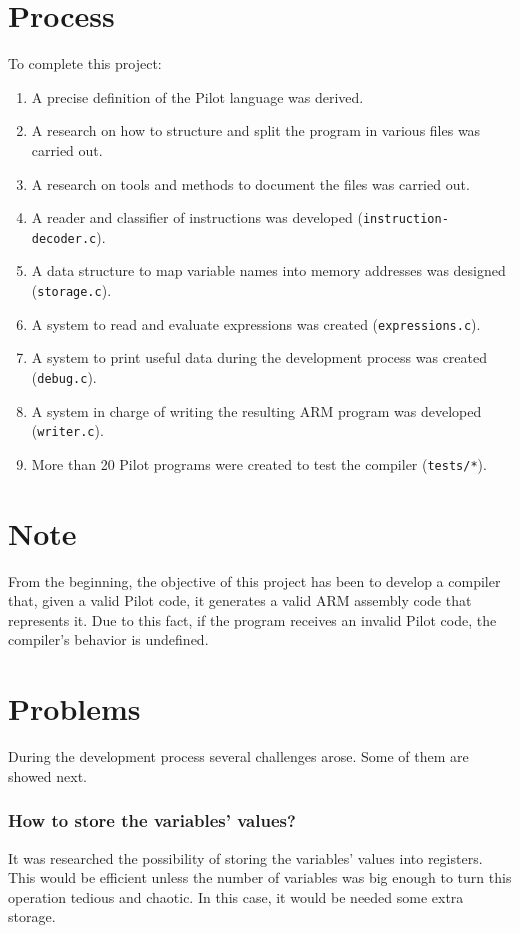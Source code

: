\documentclass[12pt,spanish]{article}
\begin{document}
\section{Process}
To complete this project:
\begin{enumerate}
\item{A precise definition of the Pilot language was derived.}
\item{A research on how to structure and split the program in various files was carried out.}
\item{A research on tools and methods to document the files was carried out.}
\item{A reader and classifier of instructions was developed (\texttt{instruction-decoder.c}).}
\item{A data structure to map variable names into memory addresses was designed (\texttt{storage.c}).}
\item{A system to read and evaluate expressions was created (\texttt{expressions.c}).}
\item{A system to print useful data during the development process was created (\texttt{debug.c}).}
\item{A system in charge of writing the resulting ARM program was developed (\texttt{writer.c}).}
\item{More than 20 Pilot programs were created to test the compiler (\texttt{tests/*}).}
\end{enumerate}

\section{Note}
From the beginning, the objective of this project has been to develop a compiler that, given a valid Pilot code, it generates a valid ARM assembly code that represents it. Due to this fact, if the program receives an invalid Pilot code, the compiler's behavior is undefined.

\section{Problems}
During the development process several challenges arose. Some of them are showed next.

\subsubsection{How to store the variables' values?}

It was researched the possibility of storing the variables' values into registers. This would be efficient unless the number of variables was big enough to turn this operation tedious and chaotic. In this case, it would be needed some extra storage.
\end{document}
